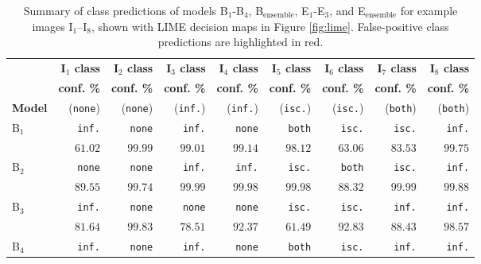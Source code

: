 \documentclass[runningheads]{llncs}
\begin{document}
\begin{table}[ht!]
	\begin{center}
		\caption{Summary of class predictions of models B$_1$-B$_4$, B$_\text{ensemble}$, E$_1$-E$_3$, and E$_\text{ensemble}$ for example images I$_1$--I$_8$, shown with LIME decision maps in Figure \ref{fig:lime}. False-positive class predictions are highlighted in red.}\label{tab:lime_predictions}
		\begin{tabularx}{\textwidth}{|X|r|r|r|r|r|r|r|r|}
			\hline
			 & \textbf{I$_1$ class} & \textbf{I$_2$ class} & \textbf{I$_3$ class} & \textbf{I$_4$ class} & \textbf{I$_5$ class} & \textbf{I$_6$ class} & \textbf{I$_7$ class} & \textbf{I$_8$ class} \\
			 & \textbf{conf. \%} & \textbf{conf. \%} & \textbf{conf. \%} & \textbf{conf. \%} & \textbf{conf. \%} & \textbf{conf. \%} & \textbf{conf. \%} & \textbf{conf. \%} \\
			\textbf{Model} & (\texttt{none}) & (\texttt{none}) & (\texttt{inf.}) & (\texttt{inf.}) & (\texttt{isc.}) & (\texttt{isc.}) & (\texttt{both}) & (\texttt{both}) \\
			\hline\hline
			B$_1$ & \cellcolor{red!25}\texttt{inf.} & \texttt{none} & \texttt{inf.} & \cellcolor{red!25}\texttt{none} & \cellcolor{red!25}\texttt{both} & \texttt{isc.} & \cellcolor{red!25}\texttt{isc.} & \cellcolor{red!25}\texttt{inf.} \\
			 & \cellcolor{red!25}$61.02$ & $99.99$ & $99.01$ & \cellcolor{red!25}$99.14$ & \cellcolor{red!25}$98.12$ & $63.06$ & \cellcolor{red!25}$83.53$ & \cellcolor{red!25}$99.75$ \\
            B$_2$ & \texttt{none}  & \texttt{none} & \texttt{inf.} & \texttt{inf.} & \texttt{isc.} & \cellcolor{red!25}\texttt{both} & \cellcolor{red!25}\texttt{isc.} & \cellcolor{red!25}\texttt{inf.} \\
			 & $89.55$ & $99.74$ & $99.99$ & $99.98$ & $99.98$ & \cellcolor{red!25}$88.32$ & \cellcolor{red!25}$99.99$ & \cellcolor{red!25}$99.88$ \\ 
			B$_3$ & \cellcolor{red!25}\texttt{inf.} & \texttt{none} & \cellcolor{red!25}\texttt{none} & \cellcolor{red!25}\texttt{none} & \texttt{isc.} & \texttt{isc.} & \cellcolor{red!25}\texttt{inf.} & \cellcolor{red!25}\texttt{inf.} \\
			 & \cellcolor{red!25}$81.64$ & $99.83$ & \cellcolor{red!25}$78.51$ & \cellcolor{red!25}$92.37$ & $61.49$ & $92.83$ & \cellcolor{red!25}$88.43$ & \cellcolor{red!25}$98.57$ \\
			B$_4$ & \cellcolor{red!25}\texttt{inf.} & \texttt{none} & \texttt{inf.} & \cellcolor{red!25}\texttt{none} & \cellcolor{red!25}\texttt{both} & \texttt{isc.} & \cellcolor{red!25}\texttt{inf.} & \cellcolor{red!25}\texttt{inf.} \\

\end{tabularx}
\end{center}
\end{table}
\end{document}
